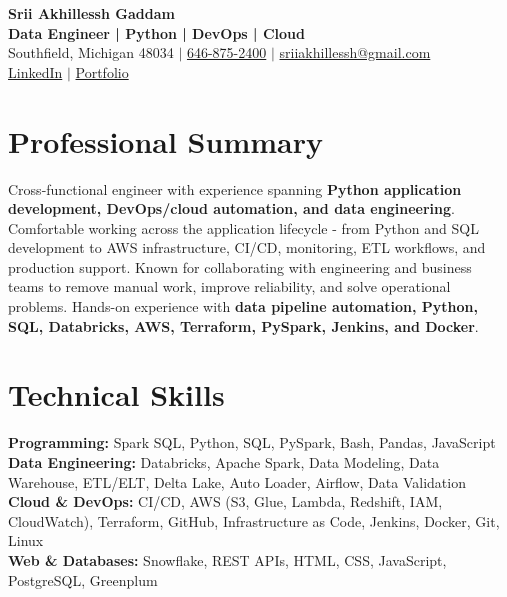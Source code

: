 \documentclass[letterpaper,10pt]{article}
\begin{document}
\fontsize{9.35pt}{10.45pt}\selectfont

\begin{center}
    {\LARGE \textbf{Srii Akhillessh Gaddam}} \\[-1pt]
    \textbf{Data Engineer | Python | DevOps | Cloud} \\[2pt]
    Southfield, Michigan 48034 $|$
    \href{tel:6468752400}{646-875-2400} $|$
    \href{mailto:sriiakhillessh@gmail.com}{sriiakhillessh@gmail.com} \\[1pt]
    \href{https://www.linkedin.com/in/srii-akhiilessh-gaddam-b48668191/}{LinkedIn} $|$
    \href{https://sriiakhillesshg.github.io/portfolio/}{Portfolio}
\end{center}
\vspace{-8pt}

\section{Professional Summary}
\small{Cross-functional engineer with experience spanning \textbf{Python application development, DevOps/cloud automation, and data engineering}. Comfortable working across the application lifecycle - from Python and SQL development to AWS infrastructure, CI/CD, monitoring, ETL workflows, and production support. Known for collaborating with engineering and business teams to remove manual work, improve reliability, and solve operational problems. Hands-on experience with \textbf{data pipeline automation, Python, SQL, Databricks, AWS, Terraform, PySpark, Jenkins, and Docker}.}

\section{Technical Skills}
\small{
\textbf{Programming:} Spark SQL, Python, SQL, PySpark, Bash, Pandas, JavaScript \\
\textbf{Data Engineering:} Databricks, Apache Spark, Data Modeling, Data Warehouse, ETL/ELT, Delta Lake, Auto Loader, Airflow, Data Validation \\
\textbf{Cloud \& DevOps:} CI/CD, AWS (S3, Glue, Lambda, Redshift, IAM, CloudWatch), Terraform, GitHub, Infrastructure as Code, Jenkins, Docker, Git, Linux \\
\textbf{Web \& Databases:} Snowflake, REST APIs, HTML, CSS, JavaScript, PostgreSQL, Greenplum
}
\end{document}
